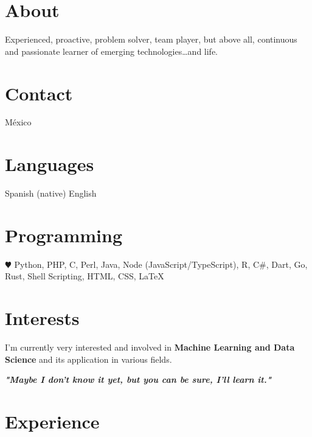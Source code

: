 \documentclass[]{friggeri-cv}
\begin{document}

\begin{aside} %
    \section{About}
    Experienced, proactive, problem solver, team player, but above all, continuous and passionate learner of emerging technologies\ldots and life.
    ~
    \section{Contact}
    {\faMapMarker} México
    ~
    ~{\nfURL}
    ~{\nfURL}
    ~{\nfURL}
    ~{\nfURL}
    ~{\nfURL}
    ~{\nfURL}
    ~{\nfURL}
    ~{\nfURL}
    ~{\nfURL}
    ~{\nfURL}
    ~
    \section{Languages}
    Spanish (native)
    English
    ~
    \section{Programming}
    {\color{black} $\varheartsuit$} Python, PHP, C, Perl, Java, Node (JavaScript/TypeScript), R, C\#, Dart, Go, Rust, Shell Scripting, HTML, CSS, {\LaTeX}
    ~
    \section{Interests}
    I’m currently very interested and involved in \textbf{Machine Learning and Data Science} and its application in various fields.
\end{aside}

\begin{center}
    \large{\textbf{\textit{"Maybe I don't know it yet, but you can be sure, I'll learn it."}}}
\end{center}

\section{Experience}
\end{document}
